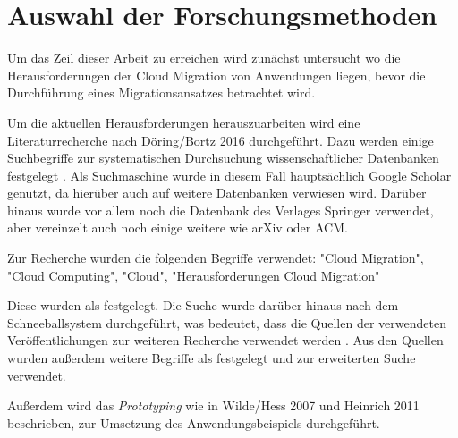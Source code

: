 \section{Auswahl der Forschungsmethoden}
\label{sec:auswahl_forschungsmethoden}

Um das Zeil dieser Arbeit zu erreichen wird zunächst untersucht wo die Herausforderungen der Cloud Migration von Anwendungen liegen, bevor die Durchführung eines Migrationsansatzes betrachtet wird.

Um die aktuellen Herausforderungen herauszuarbeiten wird eine Literaturrecherche nach Döring/Bortz 2016 durchgeführt. Dazu werden einige Suchbegriffe zur systematischen Durchsuchung wissenschaftlicher Datenbanken festgelegt \cite[Vgl.][S. 158]{Doering2016}. Als Suchmaschine wurde in diesem Fall hauptsächlich Google Scholar genutzt, da hierüber auch auf weitere Datenbanken verwiesen wird. Darüber hinaus wurde vor allem noch die Datenbank des Verlages Springer verwendet, aber vereinzelt auch noch einige weitere wie arXiv oder ACM.

Zur Recherche wurden die folgenden Begriffe verwendet: "Cloud Migration", "Cloud Computing", "Cloud", "Herausforderungen Cloud Migration"

Diese wurden als \textbf{\grqq{}} \cite[S. 158]{Doering2016} festgelegt. Die Suche wurde darüber hinaus nach dem Schneeballsystem durchgeführt, was bedeutet, dass die Quellen der verwendeten Veröffentlichungen zur weiteren Recherche verwendet werden \cite[Vgl.][S. 160]{Doering2016}. Aus den Quellen wurden außerdem weitere Begriffe als \textbf{\grqq{}} \cite[S. 158]{Doering2016} festgelegt und zur erweiterten Suche verwendet.

Außerdem wird das \textit{Prototyping} wie in Wilde/Hess 2007 und Heinrich 2011 beschrieben, zur Umsetzung des Anwendungsbeispiels durchgeführt.
